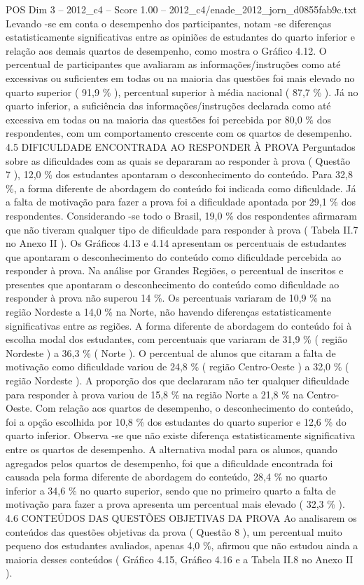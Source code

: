 \begin{textsample}{POS Dim 3 – 2012\_c4 – Score 1.00 – 2012\_c4/enade\_2012\_jorn\_d0855fab9c.txt}
Levando -se em conta o desempenho dos participantes, notam -se diferenças estatisticamente significativas entre as opiniões de estudantes do quarto inferior e relação aos demais quartos de desempenho, como mostra o Gráfico 4.12.
O percentual de participantes que avaliaram as informações/instruções como até excessivas ou suficientes em todas ou na maioria das questões foi mais elevado no quarto superior ( 91,9 \% ), percentual superior à média nacional ( 87,7 \% ).
Já no quarto inferior, a suficiência das informações/instruções declarada como até excessiva em todas ou na maioria das questões foi percebida por 80,0 \% dos respondentes, com um comportamento crescente com os quartos de desempenho. 4.5 DIFICULDADE ENCONTRADA AO RESPONDER À PROVA Perguntados sobre as dificuldades com as quais se depararam ao responder à prova ( Questão 7 ), 12,0 \% dos estudantes apontaram o desconhecimento do conteúdo.
Para 32,8 \%, a forma diferente de abordagem do conteúdo foi indicada como dificuldade.
Já a falta de motivação para fazer a prova foi a dificuldade apontada por 29,1 \% dos respondentes.
Considerando -se todo o Brasil, 19,0 \% dos respondentes afirmaram que não tiveram qualquer tipo de dificuldade para responder à prova ( Tabela II.7 no Anexo II ).
Os Gráficos 4.13 e 4.14 apresentam os percentuais de estudantes que apontaram o desconhecimento do conteúdo como dificuldade percebida ao responder à prova.
Na análise por Grandes Regiões, o percentual de inscritos e presentes que apontaram o desconhecimento do conteúdo como dificuldade ao responder à prova não superou 14 \%.
Os percentuais variaram de 10,9 \% na região Nordeste a 14,0 \% na Norte, não havendo diferenças estatisticamente significativas entre as regiões.
A forma diferente de abordagem do conteúdo foi à escolha modal dos estudantes, com percentuais que variaram de 31,9 \% ( região Nordeste ) a 36,3 \% ( Norte ).
O percentual de alunos que citaram a falta de motivação como dificuldade variou de 24,8 \% ( região Centro-Oeste ) a 32,0 \% ( região Nordeste ).
A proporção dos que declararam não ter qualquer dificuldade para responder à prova variou de 15,8 \% na região Norte a 21,8 \% na Centro-Oeste.
Com relação aos quartos de desempenho, o desconhecimento do conteúdo, foi a opção escolhida por 10,8 \% dos estudantes do quarto superior e 12,6 \% do quarto inferior.
Observa -se que não existe diferença estatisticamente significativa entre os quartos de desempenho.
A alternativa modal para os alunos, quando agregados pelos quartos de desempenho, foi que a dificuldade encontrada foi causada pela forma diferente de abordagem do conteúdo, 28,4 \% no quarto inferior a 34,6 \% no quarto superior, sendo que no primeiro quarto a falta de motivação para fazer a prova apresenta um percentual mais elevado ( 32,3 \% ). 4.6 CONTEÚDOS DAS QUESTÕES OBJETIVAS DA PROVA Ao analisarem os conteúdos das questões objetivas da prova ( Questão 8 ), um percentual muito pequeno dos estudantes avaliados, apenas 4,0 \%, afirmou que não estudou ainda a maioria desses conteúdos ( Gráfico 4.15, Gráfico 4.16 e a Tabela II.8 no Anexo II ).

\end{textsample}
